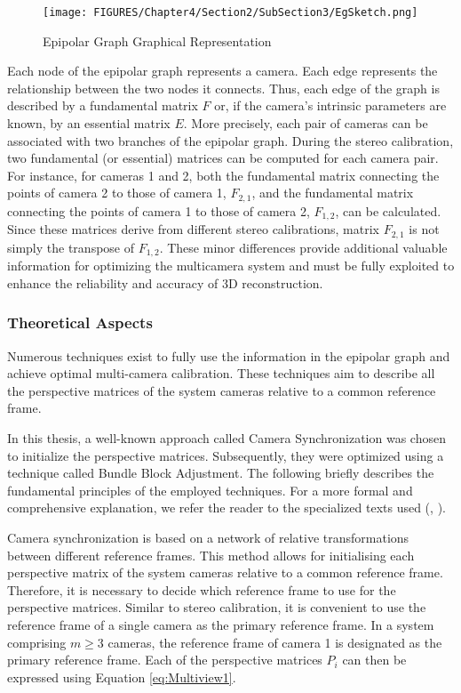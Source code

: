 \begin{figure}[!h]
  \centering
  \texttt{[image: FIGURES/Chapter4/Section2/SubSection3/EgSketch.png]}
  \caption{Epipolar Graph Graphical Representation}
  \label{fig:EgSketch}  
\end{figure}

Each node of the epipolar graph represents a camera. Each edge represents the relationship between the two nodes it connects. 
Thus, each edge of the graph is described by a fundamental matrix $F$ or, if the camera's intrinsic parameters are known, by an essential matrix $E$.
More precisely, each pair of cameras can be associated with two branches of the epipolar graph. During the stereo calibration, two fundamental (or essential) matrices can be computed for each camera pair. For instance, for cameras 1 and 2, both the fundamental matrix connecting the points of camera 2 to those of camera 1, $F_{2,1}$, and the fundamental matrix connecting the points of camera 1 to those of camera 2, $F_{1,2}$, can be calculated. Since these matrices derive from different stereo calibrations, matrix $F_{2,1}$ is not simply the transpose of $F_{1,2}$. These minor differences provide additional valuable information for optimizing the multicamera system and must be fully exploited to enhance the reliability and accuracy of 3D reconstruction.

\subsubsection{Theoretical Aspects}
\label{sez:TheoreticalMultiCalib}

Numerous techniques exist to fully use the information in the epipolar graph and achieve optimal multi-camera calibration. These techniques aim to describe all the perspective matrices of the system cameras relative to a common reference frame.

In this thesis, a well-known approach called Camera Synchronization was chosen to initialize the perspective matrices. Subsequently, they were optimized using a technique called Bundle Block Adjustment.
The following briefly describes the fundamental principles of the employed techniques. For a more formal and comprehensive explanation, we refer the reader to the specialized texts used (\cite{Hartley2003}, \cite{Fusiello2005}).

Camera synchronization is based on a network of relative transformations between different reference frames. This method allows for initialising each perspective matrix of the system cameras relative to a common reference frame.
Therefore, it is necessary to decide which reference frame to use for the perspective matrices. Similar to stereo calibration, it is convenient to use the reference frame of a single camera as the primary reference frame.
In a system comprising $m \geq 3$ cameras, the reference frame of camera 1 is designated as the primary reference frame.
Each of the perspective matrices $P_i$ can then be expressed using Equation \ref{eq:Multiview1}.


